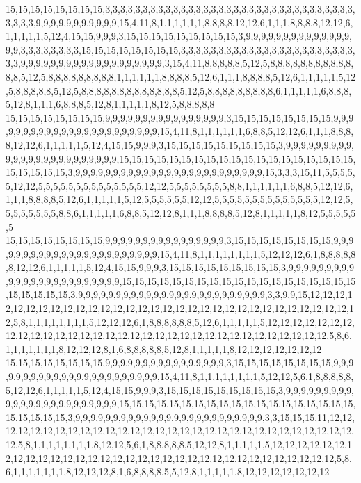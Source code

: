 15,15,15,15,15,15,15,15,3,3,3,3,3,3,3,3,3,3,3,3,3,3,3,3,3,3,3,3,3,3,3,3,3,3,3,3,3,3,3,3,3,3,3,3,3,9,9,9,9,9,9,9,9,9,9,9,15,4,11,8,1,1,1,1,1,1,8,8,8,8,12,12,6,1,1,1,8,8,8,8,12,12,6,1,1,1,1,1,5,12,4,15,15,9,9,9,3,15,15,15,15,15,15,15,15,15,3,9,9,9,9,9,9,9,9,9,9,9,9,9,9,9,9,3,3,3,3,3,3,3,3,15,15,15,15,15,15,15,15,3,3,3,3,3,3,3,3,3,3,3,3,3,3,3,3,3,3,3,3,3,3,3,3,3,9,9,9,9,9,9,9,9,9,9,9,9,9,9,9,9,9,9,9,3,15,4,11,8,8,8,8,8,5,12,5,8,8,8,8,8,8,8,8,8,8,8,8,8,5,12,5,8,8,8,8,8,8,8,8,8,1,1,1,1,1,1,8,8,8,8,5,12,6,1,1,1,8,8,8,8,5,12,6,1,1,1,1,1,5,12,5,8,8,8,8,8,5,12,5,8,8,8,8,8,8,8,8,8,8,8,8,8,5,12,5,8,8,8,8,8,8,8,8,8,6,1,1,1,1,1,6,8,8,8,5,12,8,1,1,1,6,8,8,8,5,12,8,1,1,1,1,1,8,12,5,8,8,8,8,8
15,15,15,15,15,15,15,15,9,9,9,9,9,9,9,9,9,9,9,9,9,9,9,9,3,15,15,15,15,15,15,15,15,9,9,9,9,9,9,9,9,9,9,9,9,9,9,9,9,9,9,9,9,9,9,9,15,4,11,8,1,1,1,1,1,1,6,8,8,5,12,12,6,1,1,1,8,8,8,8,12,12,6,1,1,1,1,1,5,12,4,15,15,9,9,9,3,15,15,15,15,15,15,15,15,15,3,9,9,9,9,9,9,9,9,9,9,9,9,9,9,9,9,9,9,9,9,9,9,9,9,15,15,15,15,15,15,15,15,15,15,15,15,15,15,15,15,15,15,15,15,15,15,15,15,3,9,9,9,9,9,9,9,9,9,9,9,9,9,9,9,9,9,9,9,9,9,9,9,9,9,15,3,3,3,15,11,5,5,5,5,5,12,12,5,5,5,5,5,5,5,5,5,5,5,5,5,5,12,12,5,5,5,5,5,5,5,5,8,8,1,1,1,1,1,1,6,8,8,5,12,12,6,1,1,1,8,8,8,8,5,12,6,1,1,1,1,1,5,12,5,5,5,5,5,5,12,12,5,5,5,5,5,5,5,5,5,5,5,5,5,5,12,12,5,5,5,5,5,5,5,5,8,8,6,1,1,1,1,1,6,8,8,5,12,12,8,1,1,1,8,8,8,8,5,12,8,1,1,1,1,1,8,12,5,5,5,5,5,5
15,15,15,15,15,15,15,15,9,9,9,9,9,9,9,9,9,9,9,9,9,9,9,9,3,15,15,15,15,15,15,15,15,9,9,9,9,9,9,9,9,9,9,9,9,9,9,9,9,9,9,9,9,9,9,9,15,4,11,8,1,1,1,1,1,1,1,1,5,12,12,12,6,1,8,8,8,8,8,8,12,12,6,1,1,1,1,1,5,12,4,15,15,9,9,9,3,15,15,15,15,15,15,15,15,15,3,9,9,9,9,9,9,9,9,9,9,9,9,9,9,9,9,9,9,9,9,9,9,9,9,15,15,15,15,15,15,15,15,15,15,15,15,15,15,15,15,15,15,15,15,15,15,15,15,3,9,9,9,9,9,9,9,9,9,9,9,9,9,9,9,9,9,9,9,9,9,9,9,9,9,3,3,9,9,15,12,12,12,12,12,12,12,12,12,12,12,12,12,12,12,12,12,12,12,12,12,12,12,12,12,12,12,12,12,12,12,12,5,8,1,1,1,1,1,1,1,1,5,12,12,12,6,1,8,8,8,8,8,8,5,12,6,1,1,1,1,1,5,12,12,12,12,12,12,12,12,12,12,12,12,12,12,12,12,12,12,12,12,12,12,12,12,12,12,12,12,12,12,12,12,12,5,8,6,1,1,1,1,1,1,1,8,12,12,12,8,1,6,8,8,8,8,8,5,12,8,1,1,1,1,1,8,12,12,12,12,12,12,12
15,15,15,15,15,15,15,15,9,9,9,9,9,9,9,9,9,9,9,9,9,9,9,9,3,15,15,15,15,15,15,15,15,9,9,9,9,9,9,9,9,9,9,9,9,9,9,9,9,9,9,9,9,9,9,9,15,4,11,8,1,1,1,1,1,1,1,1,5,12,12,5,6,1,8,8,8,8,8,5,12,12,6,1,1,1,1,1,5,12,4,15,15,9,9,9,3,15,15,15,15,15,15,15,15,15,3,9,9,9,9,9,9,9,9,9,9,9,9,9,9,9,9,9,9,9,9,9,9,9,9,15,15,15,15,15,15,15,15,15,15,15,15,15,15,15,15,15,15,15,15,15,15,15,15,3,9,9,9,9,9,9,9,9,9,9,9,9,9,9,9,9,9,9,9,9,9,9,9,9,9,3,3,15,15,15,11,12,12,12,12,12,12,12,12,12,12,12,12,12,12,12,12,12,12,12,12,12,12,12,12,12,12,12,12,12,12,12,5,8,1,1,1,1,1,1,1,1,8,12,12,5,6,1,8,8,8,8,8,5,12,12,8,1,1,1,1,1,5,12,12,12,12,12,12,12,12,12,12,12,12,12,12,12,12,12,12,12,12,12,12,12,12,12,12,12,12,12,12,12,12,12,5,8,6,1,1,1,1,1,1,1,8,12,12,12,8,1,6,8,8,8,8,5,5,12,8,1,1,1,1,1,8,12,12,12,12,12,12,12

